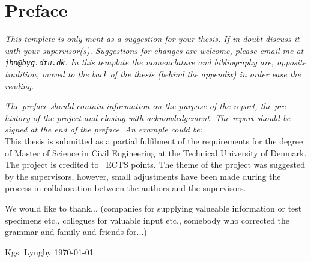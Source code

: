 \chapter*{Preface}
\emph{This templete is only ment as a suggestion for your thesis. If in doubt discuss it with your supervisor(s). Suggestions for changes are welcome, please email me at \texttt{jhn@byg.dtu.dk}. In this template the nomenclature and bibliography are, opposite tradition, moved to the back of the thesis (behind the appendix) in order ease the reading.}

\emph{The preface should contain information on the purpose of the report, the pre-history of the project and closing with acknowledgement. The report should be signed at the end of the preface. An example could be:}\\

This thesis is submitted as a partial fulfilment of the requirements for the degree of Master of Science in Civil Engineering at the Technical University of Denmark. The project is credited to \ThECTS~ECTS points. The theme of the project was suggested by the supervisors, however, small adjustments have been made during the process in collaboration between the authors and the supervisors.

We would like to thank... (companies for supplying valueable information or test specimens etc., collegues for valuable input etc., somebody who corrected the grammar and family and friends for...)\\



\noindent Kgs. Lyngby \today\\


\signature{Student 1 (sXXYYZZ)}


\signature{Student 2 (sXXYYZZ)}


